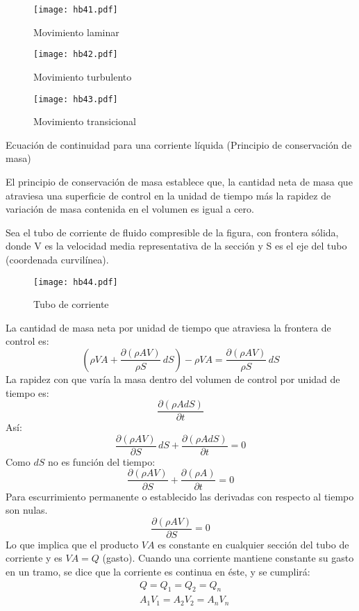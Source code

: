 \begin{figure}[h!]
\centering
    \texttt{[image: hb41.pdf]}
    \caption{Movimiento laminar}
    \label{hb41}
\end{figure}
\begin{figure}[h!]
\centering
    \texttt{[image: hb42.pdf]}
    \caption{Movimiento turbulento}
    \label{hb42}
\end{figure}
\begin{figure}[h!]
    \centering
        \texttt{[image: hb43.pdf]}
        \caption{Movimiento transicional}
        \label{hb43}
\end{figure}
Ecuación de continuidad para una corriente líquida (Principio de conservación de masa)

El principio de conservación de masa establece que, la cantidad neta de masa que atraviesa una superficie de control en la unidad de tiempo más la rapidez de variación de masa contenida en el volumen es igual a cero.

Sea el tubo de corriente de fluido compresible de la figura, con frontera sólida, donde V es la velocidad media representativa de la sección y S es el eje del tubo (coordenada curvilínea).

\begin{figure}[h!]
    \centering
        \texttt{[image: hb44.pdf]}
        \caption{Tubo de corriente}
    \label{hb44}
\end{figure}

La cantidad de masa neta por unidad de tiempo que atraviesa la frontera de control es: 
\begin{equation}
    \left(\rho VA+\frac{\partial (\rho AV)}{\rho S}\, dS\right)-\rho VA=\frac{\partial (\rho AV)}{\rho S}\,dS
\end{equation}
La rapidez con que varía la masa dentro del volumen de control por unidad de tiempo es: 
\begin{equation}
    \frac{\partial \left(\rho AdS\right)}{\partial t}
\end{equation}
Así:
\begin{equation*}
    \frac{\partial (\rho AV)}{\partial S}\,dS+\frac{\partial (\rho AdS)}{\partial t}=0
\end{equation*}
Como $dS$ no es función del tiempo:
\begin{equation*}
    \frac{\partial (\rho AV)}{\partial S}+\frac{\partial (\rho A)}{\partial t}=0
\end{equation*}
Para escurrimiento permanente o establecido las derivadas con respecto al tiempo son nulas.
\begin{equation}
    \frac{\partial (\rho AV)}{\partial S}=0
\end{equation}
Lo que implica que el producto $VA$ es constante en cualquier sección del tubo de corriente y es $VA=Q$ (gasto). Cuando una corriente mantiene constante su gasto en un tramo, se dice que la corriente es continua en éste, y se cumplirá:
\begin{align*}
    &Q=Q_1=Q_2=Q_n\\
    &A_1V_1=A_2V_2=A_nV_n
\end{align*}

